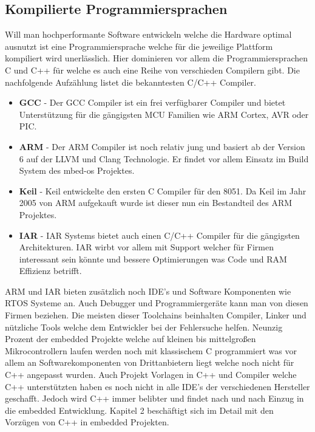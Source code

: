 \documentclass[MES,Master,ngerman]{twbook}%
\begin{document}
\subsection{Kompilierte Programmiersprachen}
Will man hochperformante Software entwickeln welche die Hardware optimal ausnutzt ist eine Programmiersprache welche für die jeweilige Plattform kompiliert wird unerlässlich. Hier dominieren vor allem die Programmiersprachen C und C++ für welche es auch eine Reihe von verschieden Compilern gibt. Die nachfolgende Aufzählung listet die bekanntesten C/C++ Compiler.

\begin{itemize}
	\item \textbf{GCC} - Der GCC Compiler ist ein frei verfügbarer Compiler und bietet Unterstützung für die gängigsten MCU Familien wie ARM Cortex, AVR oder PIC.
	\item \textbf{ARM} - Der ARM Compiler ist noch relativ jung und basiert ab der Version 6 auf der LLVM und Clang Technologie. Er findet vor allem Einsatz im Build System des mbed-os Projektes.
	\item \textbf{Keil} - Keil entwickelte den ersten C Compiler für den 8051. Da Keil im Jahr 2005 von ARM aufgekauft wurde ist dieser nun ein Bestandteil des ARM Projektes.
	\item \textbf{IAR} - IAR Systems bietet auch einen C/C++ Compiler für die gängigsten Architekturen. IAR wirbt vor allem mit Support welcher für Firmen interessant sein könnte und bessere Optimierungen was Code und RAM Effizienz betrifft.

\end{itemize}
ARM und IAR bieten zusätzlich noch IDE's und Software Komponenten wie RTOS Systeme an. Auch Debugger und Programmiergeräte kann man von diesen Firmen beziehen. Die meisten dieser Toolchains beinhalten Compiler, Linker und nützliche Tools welche dem Entwickler bei der Fehlersuche helfen.\newline
Neunzig Prozent der embedded Projekte welche auf kleinen bis mittelgroßen Mikrocontrollern laufen werden noch mit klassischem C programmiert was vor allem an Softwarekomponenten von Drittanbietern liegt welche noch nicht für C++ angepasst wurden. Auch Projekt Vorlagen in C++ und Compiler welche C++ unterstützten haben es noch nicht in alle IDE's der verschiedenen Hersteller geschafft. Jedoch wird C++ immer belibter und findet nach und nach Einzug in die embedded Entwicklung. Kapitel 2 beschäftigt sich im Detail mit den Vorzügen von C++ in embedded Projekten.
\end{document}
